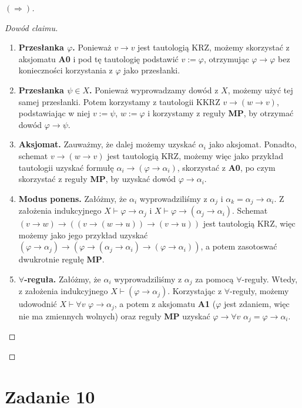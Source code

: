 \begin{proof}[\( (\Rightarrow) \)]
\begin{proof}[Dowód claimu]
    \begin{enumerate}
        \item \textbf{Przesłanka \( \varphi \).} Ponieważ \( v \to v \) jest tautologią KRZ, możemy skorzystać z aksjomatu \textbf{A0} i pod tę tautologię podstawić \(v := \varphi \), otrzymując \( \varphi \to \varphi \) bez konieczności korzystania z \( \varphi \) jako przesłanki.
        \item \textbf{Przesłanka \( \psi \in X \).} Ponieważ wyprowadzamy dowód z \( X \), możemy użyć tej samej przesłanki. Potem korzystamy z tautologii KKRZ \( v \to (w \to v) \), podstawiając w niej \( v := \psi \), \( w := \varphi \) i korzystamy z reguły \textbf{MP}, by otrzymać dowód \( \varphi \to \psi \).
        \item \textbf{Aksjomat.} Zauważmy, że dalej możemy uzyskać \( \alpha_i \) jako aksjomat. Ponadto, schemat \( v \to (w \to v) \) jest tautologią KRZ, możemy więc jako przykład tautologii uzyskać formułę \( \alpha_i \to (\varphi \to \alpha_i) \), skorzystać z \textbf{A0}, po czym skorzystać z reguły \textbf{MP}, by uzyskać dowód \( \varphi \to \alpha_i \).
        \item \textbf{Modus ponens.} Załóżmy, że \( \alpha_i \) wyprowadziliśmy z \( \alpha_j \) i \( \alpha_k = \alpha_j \to \alpha_i \). Z założenia indukcyjnego \( X \vdash \varphi \to \alpha_j \) i \( X \vdash \varphi \to (\alpha_j \to \alpha_i) \). Schemat \( (v \to w) \to ((v \to (w \to u)) \to (v \to u)) \) jest tautologią KRZ, więc możemy jako jego przykład uzyskać \( (\varphi \to \alpha_j) \to (\varphi \to (\alpha_j \to \alpha_i) \to (\varphi \to \alpha_i)) \), a potem zasotoswać dwukrotnie regułę \textbf{MP}.
        \item \textbf{\( \forall \)-reguła.} Załóżmy, że \( \alpha_i \) wyprowadziliśmy z \( \alpha_j \) za pomocą \( \forall \)-reguły. Wtedy, z założenia indukcyjnego \( X \vdash (\varphi \to \alpha_j) \). Korzystając z \( \forall \)-reguły, możemy udowodnić \( X \vdash \forall v\,\,\varphi \to \alpha_j \), a potem z aksjomatu \textbf{A1} (\( \varphi \) jest zdaniem, więc nie ma zmiennych wolnych) oraz reguły \textbf{MP} uzyskać \( \varphi \to \forall v\,\,\alpha_j = \varphi \to \alpha_i \).
    \end{enumerate}
    
\end{proof}

\end{proof}

\newpage
\section*{Zadanie 10}

